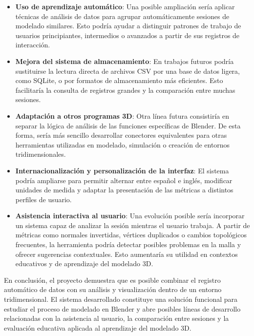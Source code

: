 \begin{itemize}
    \item \textbf{Uso de aprendizaje automático}: Una posible ampliación sería aplicar técnicas de análisis de datos para agrupar automáticamente sesiones de modelado similares. Esto podría ayudar a distinguir patrones de trabajo de usuarios principiantes, intermedios o avanzados a partir de sus registros de interacción.

    \item \textbf{Mejora del sistema de almacenamiento}: En trabajos futuros podría sustituirse la lectura directa de archivos CSV por una base de datos ligera, como SQLite, o por formatos de almacenamiento más eficientes. Esto facilitaría la consulta de registros grandes y la comparación entre muchas sesiones.

    \item \textbf{Adaptación a otros programas 3D}: Otra línea futura consistiría en separar la lógica de análisis de las funciones específicas de Blender. De esta forma, sería más sencillo desarrollar conectores equivalentes para otras herramientas utilizadas en modelado, simulación o creación de entornos tridimensionales.

    \item \textbf{Internacionalización y personalización de la interfaz}: El sistema podría ampliarse para permitir alternar entre español e inglés, modificar unidades de medida y adaptar la presentación de las métricas a distintos perfiles de usuario.

    \item \textbf{Asistencia interactiva al usuario}: Una evolución posible sería incorporar un sistema capaz de analizar la sesión mientras el usuario trabaja. A partir de métricas como normales invertidas, vértices duplicados o cambios topológicos frecuentes, la herramienta podría detectar posibles problemas en la malla y ofrecer sugerencias contextuales. Esto aumentaría su utilidad en contextos educativos y de aprendizaje del modelado 3D.
\end{itemize}

En conclusión, el proyecto demuestra que es posible combinar el registro automático de datos con su análisis y visualización dentro de un entorno tridimensional. El sistema desarrollado constituye una solución funcional para estudiar el proceso de modelado en Blender y abre posibles líneas de desarrollo relacionadas con la asistencia al usuario, la comparación entre sesiones y la evaluación educativa aplicada al aprendizaje del modelado 3D.
